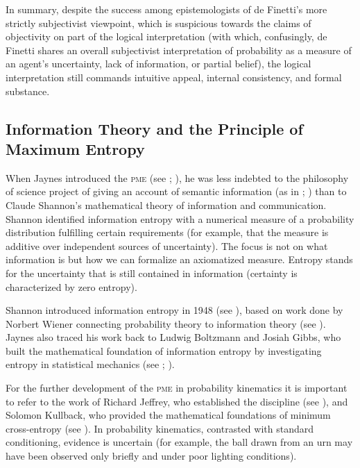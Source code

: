 \documentclass[11pt]{article}
\begin{document}
In summary, despite the success among epistemologists of de Finetti's
more strictly subjectivist viewpoint, which is suspicious towards the
claims of objectivity on part of the logical interpretation (with
which, confusingly, de Finetti shares an overall subjectivist
interpretation of probability as a measure of an agent's uncertainty,
lack of information, or partial belief), the logical interpretation
still commands intuitive appeal, internal consistency, and formal
substance.


\subsection{Information Theory and the Principle of Maximum Entropy}
\label{InformationTheoryAndThePrincipleOfMaximumEntropy}

When Jaynes introduced the \textsc{pme} (see ;
), he was less indebted to the philosophy of
science project of giving an account of semantic information (as in
; ) than
to Claude Shannon's mathematical theory of information and
communication. Shannon identified information entropy with a numerical
measure of a probability distribution fulfilling certain requirements
(for example, that the measure is additive over independent sources of
uncertainty). The focus is not on what information is but how we can
formalize an axiomatized measure. Entropy stands for the uncertainty
that is still contained in information (certainty is characterized by
zero entropy).

Shannon introduced information entropy in 1948 (see
), based on work done by Norbert Wiener
connecting probability theory to information theory (see
). Jaynes also traced his work back to Ludwig
Boltzmann and Josiah Gibbs, who built the mathematical foundation of
information entropy by investigating entropy in statistical mechanics
(see ; ).

For the further development of the \textsc{pme} in probability
kinematics it is important to refer to the work of Richard Jeffrey,
who established the discipline (see ), and
Solomon Kullback, who provided the mathematical foundations of minimum
cross-entropy (see ). In probability
kinematics, contrasted with standard conditioning, evidence is
uncertain (for example, the ball drawn from an urn may have been
observed only briefly and under poor lighting conditions).
\end{document}
